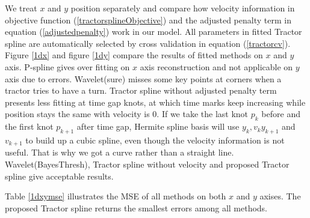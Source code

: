 We treat $x$ and $y$ position separately and compare how velocity information in objective function (\ref{tractorsplineObjective}) and the adjusted penalty term in equation (\ref{adjustedpenalty}) work in our model. All parameters in fitted Tractor spline are automatically selected by cross validation in equation (\ref{tractorcv}). Figure \ref{1dx} and figure \ref{1dy} compare the results of fitted methods on $x$ and $y$ axis. P-spline gives over fitting on $x$ axis reconstruction and not applicable on $y$ axis due to errors. Wavelet(sure) misses some key points at corners when a tractor tries to have a turn. Tractor spline without adjusted penalty term presents less fitting at time gap knots, at which time marks keep increasing while position stays the same with velocity is 0. If we take the last knot $p_k$ before and the first knot $p_{k+1}$ after time gap, Hermite spline basis will use $y_k, v_k y_{k+1}$ and $v_{k+1}$ to build up a cubic spline, even though the velocity information is not useful. That is why we got a curve rather than a straight line. Wavelet(BayesThresh), Tractor spline without velocity and proposed Tractor spline give acceptable results.

Table \ref{1dxymse} illustrates the MSE of all methods on both $x$ and $y$ axises. The proposed Tractor spline returns the smallest errors among all methods.



